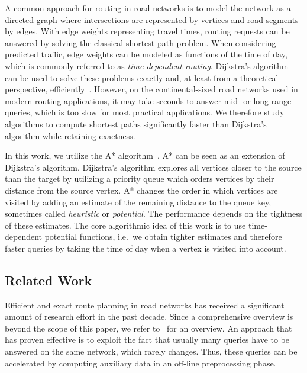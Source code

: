 \documentclass[a4paper,UKenglish,cleveref, autoref, thm-restate,anonymous]{lipics-v2021}
\begin{document}
A common approach for routing in road networks is to model the network as a directed graph where intersections are represented by vertices and road segments by edges.
With edge weights representing travel times, routing requests can be answered by solving the classical shortest path problem.
When considering predicted traffic, edge weights can be modeled as functions of the time of day, which is commonly referred to as \emph{time-dependent routing}.
Dijkstra's algorithm can be used to solve these problems exactly and, at least from a theoretical perspective, efficiently~\cite{d-ntpcg-59}.
However, on the continental-sized road networks used in modern routing applications, it may take seconds to answer mid- or long-range queries, which is too slow for most practical applications.
We therefore study algorithms to compute shortest paths significantly faster than Dijkstra's algorithm while retaining exactness.

In this work, we utilize the A* algorithm~\cite{hnr-afbhd-68}.
A* can be seen as an extension of Dijkstra's algorithm.
Dijkstra's algorithm explores all vertices closer to the source than the target by utilizing a priority queue which orders vertices by their distance from the source vertex.
A* changes the order in which vertices are visited by adding an estimate of the remaining distance to the queue key, sometimes called \emph{heuristic} or \emph{potential}.
The performance depends on the tightness of these estimates.
The core algorithmic idea of this work is to use time-dependent potential functions, i.e.\ we obtain tighter estimates and therefore faster queries by taking the time of day when a vertex is visited into account.

\subsection{Related Work}

Efficient and exact route planning in road networks has received a significant amount of research effort in the past decade.
Since a comprehensive overview is beyond the scope of this paper, we refer to~\cite{bdgmpsww-rptn-16} for an overview.
An approach that has proven effective is to exploit the fact that usually many queries have to be answered on the same network, which rarely changes.
Thus, these queries can be accelerated by computing auxiliary data in an off-line preprocessing phase.
\end{document}
